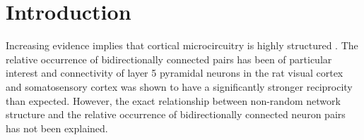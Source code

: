 \section*{Introduction}

Increasing evidence implies that cortical microcircuitry is highly structured \cite{Song2005,Perin2011}.
%
The relative occurrence of bidirectionally connected pairs has been of particular interest and connectivity of layer 5 pyramidal neurons in the rat visual cortex \cite{Song2005} and somatosensory cortex \cite{Markram1997, Perin2011} was shown to have a significantly stronger reciprocity than expected.
%
However, the exact relationship between non-random network structure and the relative occurrence of bidirectionally connected neuron pairs has not been explained.
